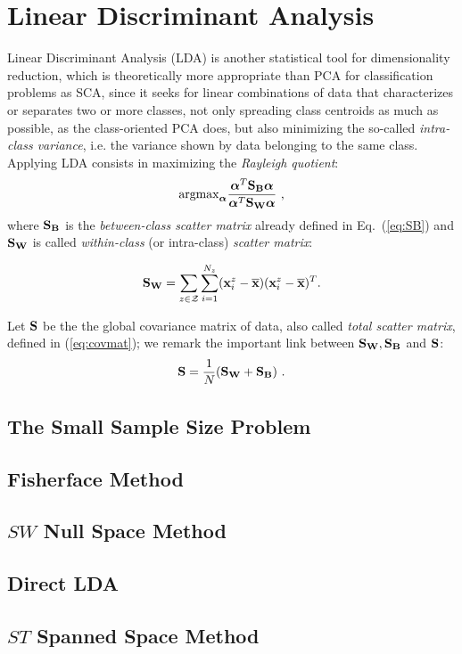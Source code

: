 \section{Linear Discriminant Analysis}

Linear Discriminant Analysis (LDA) is another statistical tool for dimensionality reduction, which is theoretically more appropriate than PCA for classification problems as SCA, since it seeks for linear combinations of data that characterizes or separates two or more classes, not only spreading class centroids as much as possible, as the class-oriented PCA does, but also minimizing the so-called {\em intra-class variance}, i.e. the variance shown by data belonging to the same class. Applying LDA consists in maximizing the {\em Rayleigh quotient}:
 \begin{equation}\label{eq:LDA}
 \mathrm{argmax}_{\AAlpha} \frac{\AAlpha^T \SB \AAlpha}{\AAlpha^T \SW \AAlpha} \mbox{ ,}
 \end{equation}
where $\SB$ is the {\em between-class scatter matrix} already defined in Eq.~(\ref{eq:SB}) and $\SW$ is called 
{\em within-class} (or intra-class) {\em scatter matrix}:

\begin{equation}
\SW = \sum_{\sensVar\in\sensVarSet}\sum_{i=1}^{\numTraces}(\sss{i}-\mmmX)(\sss{i}-\mmmX)^T \mbox{.}
\end{equation}


\begin{remark}
Let $\covmat$ be the the global covariance matrix of data, also called {\em total scatter matrix}, defined in (\ref{eq:covmat}); we remark the important link between $\SW,\SB$ and $\covmat$:
\begin{equation}
\covmat = \frac{1}{\numTraces[]}(\SW + \SB) \mbox{ .}
\end{equation}
\end{remark}

\subsection{The Small Sample Size Problem}



\subsection{Fisherface Method}


\subsection{$SW$ Null Space Method}

\subsection{Direct LDA}

\subsection{$ST$ Spanned Space Method}